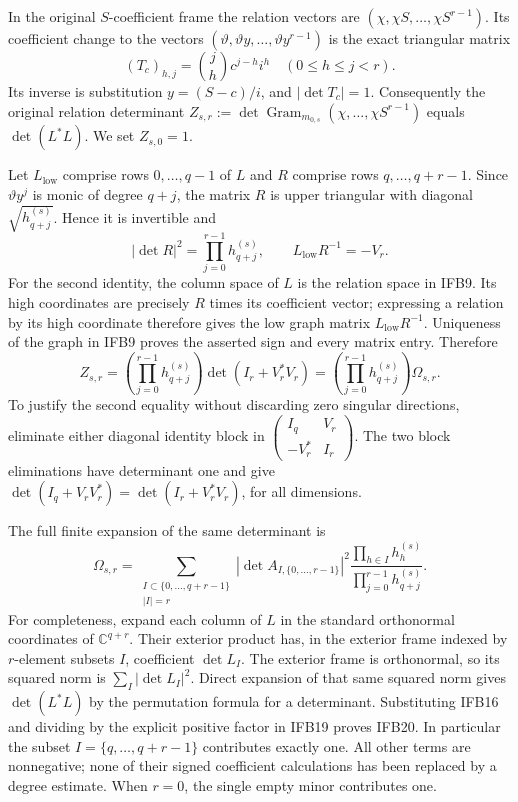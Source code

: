 In the original $S$-coefficient frame the relation vectors are
$(\chi,\chi S,\ldots,\chi S^{r-1})$. Its coefficient change to
the vectors $(\vartheta,\vartheta y,\ldots,\vartheta y^{r-1})$
is the exact triangular matrix
\[
 (T_c)_{h,j}=\binom jh c^{j-h}i^h\quad(0\leq h\leq j<r).
 \tag{IFB17}
\]
Its inverse is substitution $y=(S-c)/i$, and
$|\det T_c|=1$. Consequently the original relation determinant
$Z_{s,r}:=\det\operatorname{Gram}_{m_{0,s}}
(\chi,\ldots,\chi S^{r-1})$ equals $\det(L^*L)$.
We set $Z_{s,0}=1$.

Let $L_{\mathrm{low}}$ comprise rows $0,\ldots,q-1$ of $L$ and
$R$ comprise rows $q,\ldots,q+r-1$. Since $\vartheta y^j$ is
monic of degree $q+j$, the matrix $R$ is upper triangular with
diagonal $\sqrt{h_{q+j}^{(s)}}$. Hence it is invertible and
\[
 |\det R|^2=\prod_{j=0}^{r-1}h_{q+j}^{(s)},\qquad
 L_{\mathrm{low}}R^{-1}=-V_r.
 \tag{IFB18}
\]
For the second identity, the column space of $L$ is the relation
space in IFB9. Its high coordinates are precisely $R$ times its
coefficient vector; expressing a relation by its high coordinate
therefore gives the low graph matrix $L_{\mathrm{low}}R^{-1}$.
Uniqueness of the graph in IFB9 proves the asserted sign and every
matrix entry. Therefore
\[
 Z_{s,r}
 =\left(\prod_{j=0}^{r-1}h_{q+j}^{(s)}\right)
       \det(I_r+V_r^*V_r)
 =\left(\prod_{j=0}^{r-1}h_{q+j}^{(s)}\right)\Omega_{s,r}.
 \tag{IFB19}
\]
To justify the second equality without discarding zero singular
directions, eliminate either diagonal identity block in
$\left(\begin{smallmatrix}I_q&V_r\\-V_r^*&I_r\end{smallmatrix}\right)$.
The two block eliminations have determinant one and give
$\det(I_q+V_rV_r^*)=\det(I_r+V_r^*V_r)$, for all dimensions.

The full finite expansion of the same determinant is
\[
 \boxed{\displaystyle
 \Omega_{s,r}=
 \sum_{\substack{I\subset\{0,\ldots,q+r-1\}\\|I|=r}}
 |\det A_{I,\{0,\ldots,r-1\}}|^2
 \frac{\prod_{h\in I}h_h^{(s)}}
      {\prod_{j=0}^{r-1}h_{q+j}^{(s)}}.}
 \tag{IFB20}
\]
For completeness, expand each column of $L$ in the standard
orthonormal coordinates of $\mathbb C^{q+r}$. Their exterior
product has, in the exterior frame indexed by $r$-element subsets
$I$, coefficient $\det L_I$. The exterior frame is orthonormal,
so its squared norm is $\sum_I|\det L_I|^2$. Direct expansion of
that same squared norm gives $\det(L^*L)$ by the permutation
formula for a determinant. Substituting IFB16 and dividing by the
explicit positive factor in IFB19 proves IFB20. In particular the
subset $I=\{q,\ldots,q+r-1\}$ contributes exactly one. All other
terms are nonnegative; none of their signed coefficient calculations
has been replaced by a degree estimate. When $r=0$, the single
empty minor contributes one.

